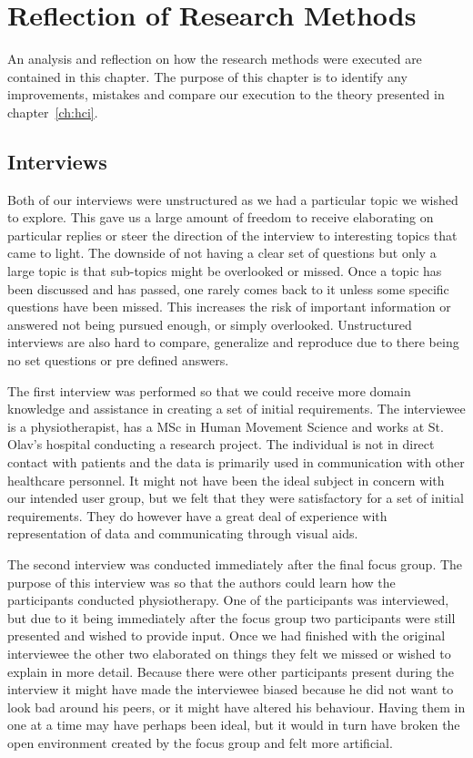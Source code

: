 \chapter{Reflection of Research Methods}
An analysis and reflection on how the research methods were executed are contained in this chapter. The purpose of this chapter is to identify any improvements, mistakes and compare our execution to the theory presented in chapter~\ref{ch:hci}.

\section{Interviews}
Both of our interviews were unstructured as we had a particular topic we wished to explore. This gave us a large amount of freedom to receive elaborating on particular replies or steer the direction of the interview to interesting topics that came to light. The downside of not having a clear set of questions but only a large topic is that sub-topics might be overlooked or missed. Once a topic has been discussed and has passed, one rarely comes back to it unless some specific questions have been missed. This increases the risk of important information or answered not being pursued enough, or simply overlooked. Unstructured interviews are also hard to compare, generalize and reproduce due to there being no set questions or pre defined answers.

The first interview was performed so that we could receive more domain knowledge and assistance in creating a set of initial requirements. The interviewee is a physiotherapist, has a MSc in Human Movement Science and works at St. Olav's hospital conducting a research project. The individual is not in direct contact with patients and the data is primarily used in communication with other healthcare personnel. It might not have been the ideal subject in concern with our intended user group, but we felt that they were satisfactory for a set of initial requirements. They do however have a great deal of experience with representation of data and communicating through visual aids.

The second interview was conducted immediately after the final focus group. The purpose of this interview was so that the authors could learn how the participants conducted physiotherapy. One of the participants was interviewed, but due to it being immediately after the focus group two participants were still presented and wished to provide input. Once we had finished with the original interviewee the other two elaborated on things they felt we missed or wished to explain in more detail. Because there were other participants present during the interview it might have made the interviewee biased because he did not want to look bad around his peers, or it might have altered his behaviour. Having them in one at a time may have perhaps been ideal, but it would in turn have broken the open environment created by the focus group and felt more artificial.

